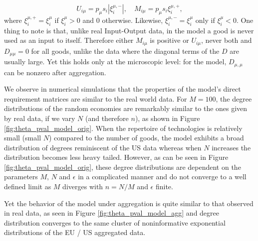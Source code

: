 \begin{equation}
  \label{eq:io_4}
  U_{i\mu} = p_\mu s_i \left|\xi_i^{\mu, -}\right|, \quad M_{i\mu} =
  p_\mu s_i \xi_i^{\mu, +},
\end{equation}
where $\xi_i^{\mu,+} = \xi_i^\mu$ if $\xi_i^\mu > 0$ and $0$
otherwise. Likewise, $\xi_i^{\mu, -} = \xi_i^\mu$ only if
$\xi_i^\mu < 0$. One thing to note is that, unlike real Input-Output data, in
the model a good is never used as an input to itself. Therefore either $M_{i\mu}$ is positive or $U_{i\mu}$, never
both and $D_{\mu\mu} = 0$ for all goods, unlike the data where the
diagonal terms of the $D$ are usually large. Yet this holds only at the
microscopic level: for the model, $D_{\mu,\mu}$ can be nonzero after
aggregation.


We observe in numerical simulations that the properties of the model's direct requirement matrices are similar to the
real world data. For $M=100$, the degree distributions of the random
economies are remarkably similar to the ones given by real data, if we
vary $N$ (and therefore $n$), as shown in Figure
\ref{fig:theta_pval_model_orig}. When the repertoire of technologies is
relatively small (small $N$) compared to the number of goods, the
model exhibits a broad distribution of degrees reminiscent of the US
data whereas when $N$ increases the distribution becomes less heavy
tailed. However, as can be seen in Figure \ref{fig:theta_pval_model_orig}, these degree distributions are dependent on the
parameters $M$, $N$ and $\epsilon$ in a complicated manner and do
not converge to a well defined limit as $M$ diverges with $n=N/M$ and
$\epsilon$ finite.

Yet the behavior of the model under aggregation is quite similar to
that observed in real data, as seen in Figure
\ref{fig:theta_pval_model_agg} and degree distribution converges to
the same cluster of noninformative exponential distributions of the EU
/ US aggregated data.

